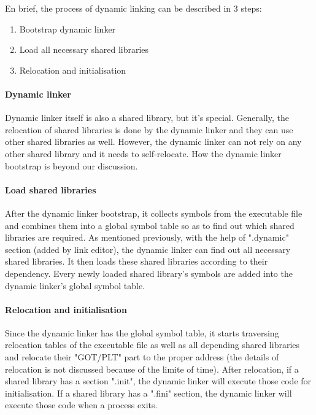         
    En brief, the process of dynamic linking can be described in 3 steps:
        \begin{enumerate}
            \item Bootstrap dynamic linker
            \item Load all necessary shared libraries
            \item Relocation and initialisation
        \end{enumerate}
      
        \paragraph{Dynamic linker}        
        Dynamic linker itself is also a shared library, but it's special. Generally, the relocation of shared libraries is done by the dynamic linker and they can use other shared libraries as well\cite{LAL-00}. However, the dynamic linker can not rely on any other shared library and it needs to self-relocate. How the dynamic linker bootstrap is beyond our discussion.
        
        \paragraph{Load shared libraries}
        After the dynamic linker bootstrap, it collects symbols from the executable file and combines them into a global symbol table so as to find out which shared libraries are required\cite{LAL-00}. As mentioned previously, with the help of ".dynamic" section (added by link editor), the dynamic linker can find out all necessary shared libraries. It then loads these shared libraries according to their dependency. Every newly loaded shared library's symbols are added into the dynamic linker's global symbol table\cite{LAL-00}.
    
        \paragraph{Relocation and initialisation}
        Since the dynamic linker has the global symbol table, it starts traversing relocation tables of the executable file as well as all depending shared libraries and relocate their "GOT/PLT" part to the proper address (the details of relocation is not discussed because of the limite of time)\cite{LAL-00}. After relocation, if a shared library has a section ".init", the dynamic linker will execute those code for initialisation. If a shared library has a ".fini" section, the dynamic linker will execute those code when a process exits\cite{LAL-00}.  
        
